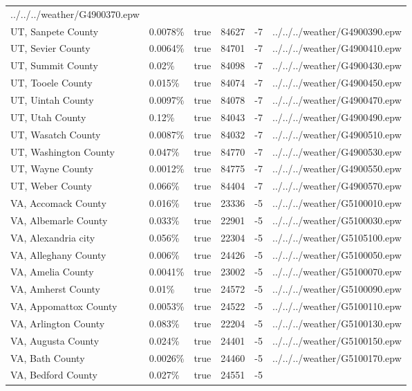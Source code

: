 \begin{longtable}[]{@{}llllll@{}}
../../../weather/G4900370.epw \\
UT, Sanpete County & 0.0078\% & true & 84627 & -7 &
../../../weather/G4900390.epw \\
UT, Sevier County & 0.0064\% & true & 84701 & -7 &
../../../weather/G4900410.epw \\
UT, Summit County & 0.02\% & true & 84098 & -7 &
../../../weather/G4900430.epw \\
UT, Tooele County & 0.015\% & true & 84074 & -7 &
../../../weather/G4900450.epw \\
UT, Uintah County & 0.0097\% & true & 84078 & -7 &
../../../weather/G4900470.epw \\
UT, Utah County & 0.12\% & true & 84043 & -7 &
../../../weather/G4900490.epw \\
UT, Wasatch County & 0.0087\% & true & 84032 & -7 &
../../../weather/G4900510.epw \\
UT, Washington County & 0.047\% & true & 84770 & -7 &
../../../weather/G4900530.epw \\
UT, Wayne County & 0.0012\% & true & 84775 & -7 &
../../../weather/G4900550.epw \\
UT, Weber County & 0.066\% & true & 84404 & -7 &
../../../weather/G4900570.epw \\
VA, Accomack County & 0.016\% & true & 23336 & -5 &
../../../weather/G5100010.epw \\
VA, Albemarle County & 0.033\% & true & 22901 & -5 &
../../../weather/G5100030.epw \\
VA, Alexandria city & 0.056\% & true & 22304 & -5 &
../../../weather/G5105100.epw \\
VA, Alleghany County & 0.006\% & true & 24426 & -5 &
../../../weather/G5100050.epw \\
VA, Amelia County & 0.0041\% & true & 23002 & -5 &
../../../weather/G5100070.epw \\
VA, Amherst County & 0.01\% & true & 24572 & -5 &
../../../weather/G5100090.epw \\
VA, Appomattox County & 0.0053\% & true & 24522 & -5 &
../../../weather/G5100110.epw \\
VA, Arlington County & 0.083\% & true & 22204 & -5 &
../../../weather/G5100130.epw \\
VA, Augusta County & 0.024\% & true & 24401 & -5 &
../../../weather/G5100150.epw \\
VA, Bath County & 0.0026\% & true & 24460 & -5 &
../../../weather/G5100170.epw \\
VA, Bedford County & 0.027\% & true & 24551 & -5 &

\end{longtable}
